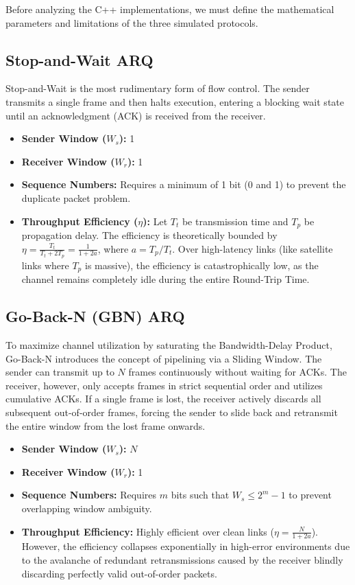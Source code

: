 \documentclass[12pt, a4paper]{article}
\begin{document}
Before analyzing the C++ implementations, we must define the mathematical parameters and limitations of the three simulated protocols.

\subsection{Stop-and-Wait ARQ}
Stop-and-Wait is the most rudimentary form of flow control. The sender transmits a single frame and then halts execution, entering a blocking wait state until an acknowledgment (ACK) is received from the receiver. 
\begin{itemize}
    \item \textbf{Sender Window ($W_s$):} 1
    \item \textbf{Receiver Window ($W_r$):} 1
    \item \textbf{Sequence Numbers:} Requires a minimum of 1 bit (0 and 1) to prevent the duplicate packet problem.
    \item \textbf{Throughput Efficiency ($\eta$):} Let $T_t$ be transmission time and $T_p$ be propagation delay. The efficiency is theoretically bounded by $\eta = \frac{T_t}{T_t + 2T_p} = \frac{1}{1 + 2a}$, where $a = T_p / T_t$. Over high-latency links (like satellite links where $T_p$ is massive), the efficiency is catastrophically low, as the channel remains completely idle during the entire Round-Trip Time.
\end{itemize}

\subsection{Go-Back-N (GBN) ARQ}
To maximize channel utilization by saturating the Bandwidth-Delay Product, Go-Back-N introduces the concept of pipelining via a Sliding Window. The sender can transmit up to $N$ frames continuously without waiting for ACKs. The receiver, however, only accepts frames in strict sequential order and utilizes cumulative ACKs. If a single frame is lost, the receiver actively discards all subsequent out-of-order frames, forcing the sender to slide back and retransmit the entire window from the lost frame onwards.
\begin{itemize}
    \item \textbf{Sender Window ($W_s$):} $N$
    \item \textbf{Receiver Window ($W_r$):} 1
    \item \textbf{Sequence Numbers:} Requires $m$ bits such that $W_s \le 2^m - 1$ to prevent overlapping window ambiguity.
    \item \textbf{Throughput Efficiency:} Highly efficient over clean links ($\eta = \frac{N}{1 + 2a}$). However, the efficiency collapses exponentially in high-error environments due to the avalanche of redundant retransmissions caused by the receiver blindly discarding perfectly valid out-of-order packets.
\end{itemize}
\end{document}

